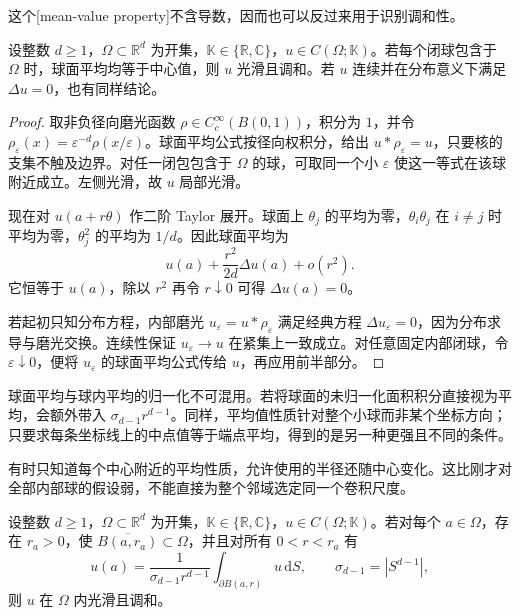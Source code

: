 这个[mean-value property]不含导数，因而也可以反过来用于识别调和性。

\begin{proposition}[平均值性质的逆命题]\label{b2:prop:13-converse-mean}
设整数 \(d\geq1\)，\(\Omega\subset\mathbb R^d\) 为开集，\(\mathbb K\in\{\mathbb R,\mathbb C\}\)，\(u\in C(\Omega;\mathbb K)\)。若每个闭球包含于 \(\Omega\) 时，球面平均均等于中心值，则 \(u\) 光滑且调和。若 \(u\) 连续并在分布意义下满足 \(\Delta u=0\)，也有同样结论。
\end{proposition}
\begin{proof}
取非负径向磨光函数 \(\rho\in C_c^\infty(B(0,1))\)，积分为 \(1\)，并令 \(\rho_\varepsilon(x)=\varepsilon^{-d}\rho(x/\varepsilon)\)。球面平均公式按径向权积分，给出 \(u*\rho_\varepsilon=u\)，只要核的支集不触及边界。对任一闭包包含于 \(\Omega\) 的球，可取同一个小 \(\varepsilon\) 使这一等式在该球附近成立。左侧光滑，故 \(u\) 局部光滑。

现在对 \(u(a+r\theta)\) 作二阶 Taylor 展开。球面上 \(\theta_j\) 的平均为零，\(\theta_i\theta_j\) 在 \(i\ne j\) 时平均为零，\(\theta_j^2\) 的平均为 \(1/d\)。因此球面平均为
\[
 u(a)+\dfrac{r^2}{2d}\Delta u(a)+o(r^2).
\]
它恒等于 \(u(a)\)，除以 \(r^2\) 再令 \(r\downarrow0\) 可得 \(\Delta u(a)=0\)。

若起初只知分布方程，内部磨光 \(u_\varepsilon=u*\rho_\varepsilon\) 满足经典方程 \(\Delta u_\varepsilon=0\)，因为分布求导与磨光交换。连续性保证 \(u_\varepsilon\to u\) 在紧集上一致成立。对任意固定内部闭球，令 \(\varepsilon\downarrow0\)，便将 \(u_\varepsilon\) 的球面平均公式传给 \(u\)，再应用前半部分。
\end{proof}

球面平均与球内平均的归一化不可混用。若将球面的未归一化面积积分直接视为平均，会额外带入 \(\sigma_{d-1}r^{d-1}\)。同样，平均值性质针对整个小球而非某个坐标方向；只要求每条坐标线上的中点值等于端点平均，得到的是另一种更强且不同的条件。

有时只知道每个中心附近的平均性质，允许使用的半径还随中心变化。这比刚才对全部内部球的假设弱，不能直接为整个邻域选定同一个卷积尺度。

\begin{proposition}[局部平均值性质的逆命题]\label{b2:prop:13-local-converse-mean}
设整数 \(d\geq1\)，\(\Omega\subset\mathbb R^d\) 为开集，\(\mathbb K\in\{\mathbb R,\mathbb C\}\)，\(u\in C(\Omega;\mathbb K)\)。若对每个 \(a\in\Omega\)，存在 \(r_a>0\)，使 \(\overline{B(a,r_a)}\subset\Omega\)，并且对所有 \(0<r<r_a\) 有
\[
 u(a)=\frac1{\sigma_{d-1}r^{d-1}}
           \int_{\partial B(a,r)}u\,\mathrm{d}S,
 \qquad \sigma_{d-1}=|S^{d-1}|,
\]
则 \(u\) 在 \(\Omega\) 内光滑且调和。
\end{proposition}


